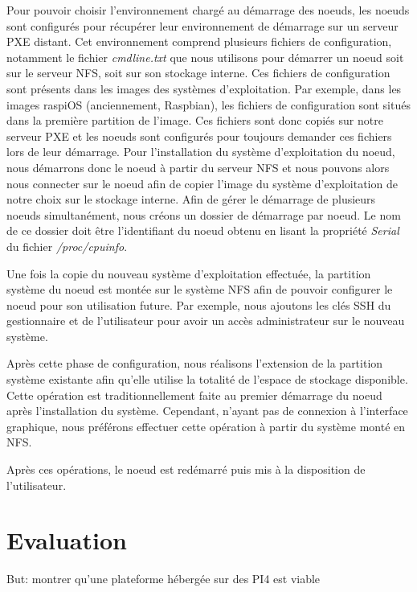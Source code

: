 \documentclass[letterpaper, 10 pt, conference]{ieeeconf}
\begin{document}
Pour pouvoir choisir l'environnement chargé au démarrage des noeuds, les noeuds sont configurés pour récupérer leur environnement de démarrage sur un serveur PXE distant. Cet environnement comprend plusieurs fichiers de configuration, notamment le fichier \textit{cmdline.txt} que nous utilisons pour démarrer un noeud soit sur le serveur NFS, soit sur son stockage interne. Ces fichiers de configuration sont présents dans les images des systèmes d'exploitation. Par exemple, dans les images raspiOS (anciennement, Raspbian), les fichiers de configuration sont situés dans la première partition de l'image. Ces fichiers sont donc copiés sur notre serveur PXE et les noeuds sont configurés pour toujours demander ces fichiers lors de leur démarrage. Pour l'installation du système d'exploitation du noeud, nous démarrons donc le noeud à partir du serveur NFS et nous pouvons alors nous connecter sur le noeud afin de copier l'image du système d'exploitation de notre choix sur le stockage interne.
Afin de gérer le démarrage de plusieurs noeuds simultanément, nous créons un dossier de démarrage par noeud. Le nom de ce dossier doit être l'identifiant du noeud obtenu en lisant la propriété \textit{Serial} du fichier \textit{/proc/cpuinfo}.

Une fois la copie du nouveau système d'exploitation effectuée, la partition système du noeud est montée sur le système NFS afin de pouvoir configurer le noeud pour son utilisation future. Par exemple, nous ajoutons les clés SSH du gestionnaire et de l'utilisateur pour avoir un accès administrateur sur le nouveau système.

Après cette phase de configuration, nous réalisons l'extension de la partition système existante afin qu'elle utilise la totalité de l'espace de stockage disponible. Cette opération est traditionnellement faite au premier démarrage du noeud après l'installation du système. Cependant, n'ayant pas de connexion à l'interface graphique, nous préférons effectuer cette opération à partir du système monté en NFS.

Après ces opérations, le noeud est redémarré puis mis à la disposition de l'utilisateur.

\section{Evaluation}
\label{sec:implementation}
But: montrer qu'une plateforme hébergée sur des PI4 est viable
\end{document}
